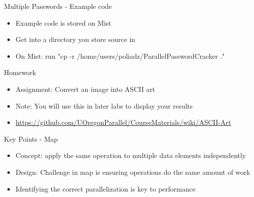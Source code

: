 \documentclass[xcolor=dvipsnames]{beamer}
\begin{document}
	\begin{frame}{Multiple Passwords - Example code}
		\begin{itemize}
      \item Example code is stored on Mist
      \item Get into a directory you store source in 
			\item On Mist: run "cp -r /home/users/poliadz/ParallelPasswordCracker ."
		\end{itemize}
	\end{frame}
	
  \begin{frame}{Homework}
	\begin{itemize}
		\item Assignment: Convert an image into ASCII art
		\item Note: You will use this in later labs to display your results
		\item \href{https://github.com/UOregonParallel/CourseMaterials/wiki/ASCII-Art}{\url{https://github.com/UOregonParallel/CourseMaterials/wiki/ASCII-Art}}
	\end{itemize}
  \end{frame}
  
  \begin{frame}{Key Points - Map}
		\begin{itemize}
      \item Concept: apply the same operation to multiple data elements independently
      \item Design: Challenge in map is ensuring operations do the same amount of work
			\item Identifying the correct parallelization is key to performance
		\end{itemize}
	\end{frame}
	
\end{document}
